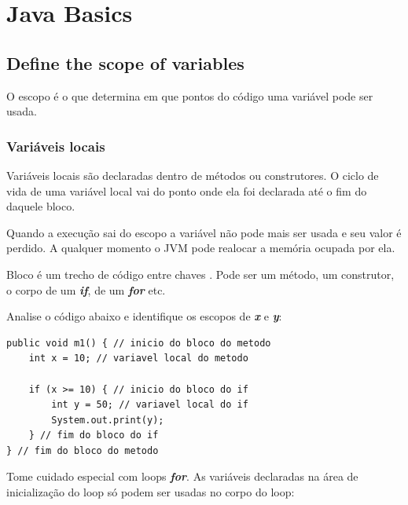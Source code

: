 \documentclass[12pt]{article}
\begin{document}
\newpage

\setcounter{page}{1} %
\tableofcontents %
\pagestyle{fancy}
\fancyfoot[C]{\thepage} %
\newpage

\listoffigures %
\newpage

\setcounter{page}{1} %
\pagestyle{fancy}
\fancyfoot[C]{\thepage}


\section{Java Basics}
\subsection{Define the scope of variables}

O escopo é o que determina em que pontos do código uma variável pode ser usada.

\subsubsection{Variáveis locais}

Variáveis locais são declaradas dentro de métodos ou construtores. O ciclo de vida de uma variável local vai do ponto onde ela foi declarada até o fim do daquele bloco.

Quando a execução sai do escopo a variável não pode mais ser usada e seu valor é perdido. A qualquer momento o JVM pode realocar a memória ocupada por ela.

Bloco é um trecho de código entre chaves \textbf{\textit{{}}}. Pode ser um método, um construtor, o corpo de um \textbf{\textit{if}}, de um \textbf{\textit{for}} etc.

Analise o código abaixo e identifique os escopos de \textbf{\textit{x}} e \textbf{\textit{y}}:

\begin{lstlisting}
public void m1() { // inicio do bloco do metodo
	int x = 10; // variavel local do metodo
	
	if (x >= 10) { // inicio do bloco do if
		int y = 50; // variavel local do if
		System.out.print(y);
	} // fim do bloco do if
} // fim do bloco do metodo
\end{lstlisting}



Tome cuidado especial com loops \textbf{\textit{for}}. As variáveis declaradas na área de inicialização do loop só podem ser usadas no corpo do loop:
\end{document}
